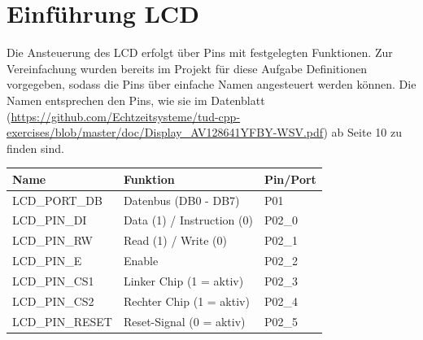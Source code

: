 


\section*{Einführung LCD}
Die Ansteuerung des LCD erfolgt über Pins mit festgelegten Funktionen.
Zur Vereinfachung wurden bereits im Projekt für diese Aufgabe Definitionen vorgegeben, sodass die Pins über einfache Namen angesteuert werden können. Die Namen entsprechen den Pins, wie sie im Datenblatt (\url{https://github.com/Echtzeitsysteme/tud-cpp-exercises/blob/master/doc/Display_AV128641YFBY-WSV.pdf}) ab Seite 10 zu finden sind.

\begin{center}
	\begin{tabular}{l|l|l}
		\toprule
		\textbf{Name} & \textbf{Funktion} & \textbf{Pin/Port} \\ 
		\midrule
		LCD\_PORT\_DB & Datenbus (DB0 - DB7) & P01 \\ 
		LCD\_PIN\_DI & Data (1) / Instruction (0) & P02\_0 \\ 
		LCD\_PIN\_RW & Read (1) / Write (0) & P02\_1 \\ 
		LCD\_PIN\_E & Enable & P02\_2 \\ 
		LCD\_PIN\_CS1 & Linker Chip (1 = aktiv) & P02\_3 \\ 
		LCD\_PIN\_CS2 & Rechter Chip (1 = aktiv) & P02\_4 \\ 
		LCD\_PIN\_RESET & Reset-Signal (0 = aktiv) & P02\_5 \\ 
		\bottomrule
	\end{tabular}
\end{center}

